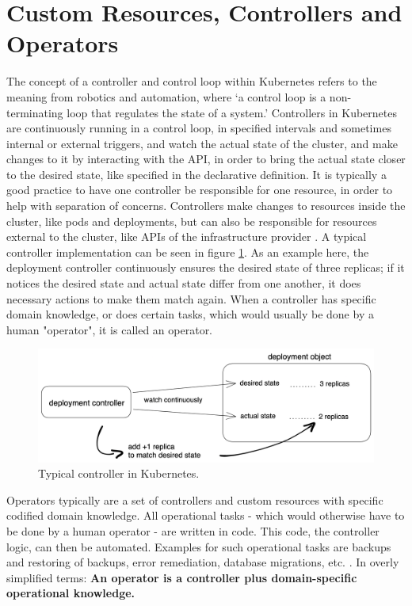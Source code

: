 \section{Custom Resources, Controllers and Operators}
The concept of a controller and control loop within Kubernetes refers to the
meaning from robotics and automation, where
\enquote*{a control loop is a non-terminating loop that regulates the state of a system.}
\autocite{controllersKubernetes}
Controllers in Kubernetes are continuously running in a control loop,
in specified intervals and sometimes internal or external triggers, 
and watch the actual state of the cluster,
and make changes to it by interacting with the API,
in order to bring the actual state closer to the desired state,
like specified in the declarative definition.
It is typically a good practice to have one controller
be responsible for one resource, 
in order to help with separation of concerns.
Controllers make changes to resources inside the cluster,
like pods and deployments,
but can also be responsible for resources external to the cluster,
like APIs of the infrastructure provider
\autocite{controllersKubernetes}.
A typical controller implementation can be seen in figure
\ref{fig:typicalControllerKubernetes}.
As an example here, the deployment controller continuously ensures the desired state
of three replicas; if it notices the desired state and actual state differ
from one another, it does necessary actions to make them match again.
When a controller has specific domain knowledge,
or does certain tasks, which would usually be done by a human "operator",
it is called an operator.

\begin{figure}[h]
	\centering
	\includegraphics[width=1.00\linewidth]{assets/typical-controller.png}
	\caption{Typical controller in Kubernetes.
	}
	\label{fig:typicalControllerKubernetes}	
\end{figure}

Operators typically are a set of controllers and custom resources
with specific codified domain knowledge.
All operational tasks -
which would otherwise have to be done by a human operator -
are written in code.
This code, the controller logic, can then be automated.
Examples for such operational tasks are
backups and restoring of backups, error remediation, database migrations, etc.
\autocite{operatorWhitepaperV1}.
In overly simplified terms:
\textbf{An operator is a controller plus domain-specific operational knowledge.}
\autocite{operatorWhitepaperV1}

